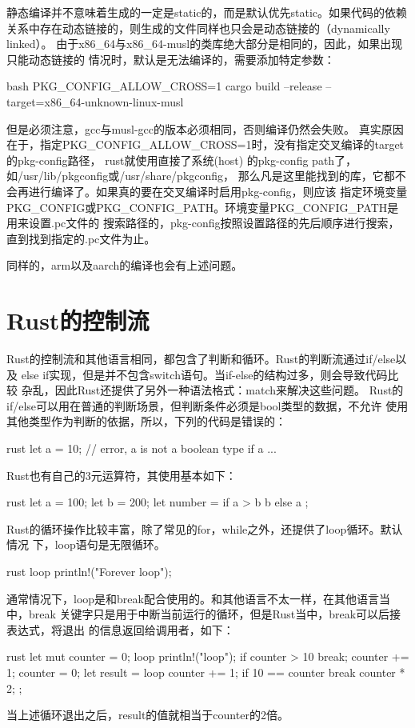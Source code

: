 \begin{note}
静态编译并不意味着生成的一定是static的，而是默认优先static。如果代码的依赖
关系中存在动态链接的，则生成的文件同样也只会是动态链接的（dynamically linked）。
由于x86\_64与x86\_64-musl的类库绝大部分是相同的，因此，如果出现只能动态链接的
情况时，默认是无法编译的，需要添加特定参数：
\begin{code-block}{bash}
PKG_CONFIG_ALLOW_CROSS=1 cargo build --release --target=x86_64-unknown-linux-musl
\end{code-block}

但是必须注意，gcc与musl-gcc的版本必须相同，否则编译仍然会失败。
真实原因在于，指定PKG\_CONFIG\_ALLOW\_CROSS=1时，没有指定交叉编译的target的pkg-config路径，
rust就使用直接了系统(host) 的pkg-config path了，如/usr/lib/pkgconfig或/usr/share/pkgconfig，
那么凡是这里能找到的库，它都不会再进行编译了。如果真的要在交叉编译时启用pkg-config，则应该
指定环境变量PKG\_CONFIG或PKG\_CONFIG\_PATH。环境变量PKG\_CONFIG\_PATH是用来设置.pc文件的
搜索路径的，pkg-config按照设置路径的先后顺序进行搜索，直到找到指定的.pc文件为止。

同样的，arm以及aarch的编译也会有上述问题。
\end{note}

\section{Rust的控制流}
Rust的控制流和其他语言相同，都包含了判断和循环。Rust的判断流通过if/else以及
else if实现，但是并不包含switch语句。当if-else的结构过多，则会导致代码比较
杂乱，因此Rust还提供了另外一种语法格式：match来解决这些问题。 Rust的if/else可以用在普通的判断场景，但判断条件必须是bool类型的数据，不允许
使用其他类型作为判断的依据，所以，下列的代码是错误的：
\begin{code-block}{rust}
let a = 10;
// error, a is not a boolean type
if a {
    ...
}
\end{code-block}

Rust也有自己的3元运算符，其使用基本如下：
\begin{code-block}{rust}
let a = 100;
let b = 200;
let number = if a > b {
    b
} else {
    a
};

\end{code-block}

Rust的循环操作比较丰富，除了常见的for，while之外，还提供了loop循环。默认情况
下，loop语句是无限循环。
\begin{code-block}{rust}
loop {
    println!("Forever loop");
}
\end{code-block}
通常情况下，loop是和break配合使用的。和其他语言不太一样，在其他语言当中，break
关键字只是用于中断当前运行的循环，但是Rust当中，break可以后接表达式，将退出
的信息返回给调用者，如下：
\begin{code-block}{rust}
let mut counter = 0;
loop {
    println!("loop");
    if counter > 10 {
        break;
    }
    counter += 1;
}
counter = 0;
let result = loop {
    counter += 1;
    if 10 == counter {
        break counter * 2;
    }
};
\end{code-block}
当上述循环退出之后，result的值就相当于counter的2倍。

